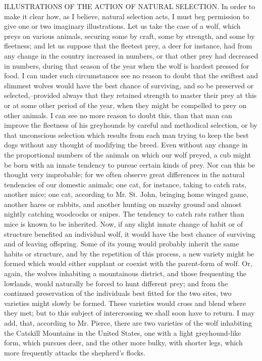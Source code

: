 ILLUSTRATIONS OF THE ACTION OF NATURAL SELECTION.
In order to make it clear how, as I believe, natural selection acts, I must beg permission to give one or two imaginary illustrations. Let us take the case of a wolf, which preys on various animals, securing some by craft, some by strength, and some by fleetness; and let us suppose that the fleetest prey, a deer for instance, had from any change in the country increased in numbers, or that other prey had decreased in numbers, during that season of the year when the wolf is hardest pressed for food. I can under such circumstances see no reason to doubt that the swiftest and slimmest wolves would have the best chance of surviving, and so be preserved or selected,--provided always that they retained strength to master their prey at this or at some other period of the year, when they might be compelled to prey on other animals. I can see no more reason to doubt this, than that man can improve the fleetness of his greyhounds by careful and methodical selection, or by that unconscious selection which results from each man trying to keep the best dogs without any thought of modifying the breed.
Even without any change in the proportional numbers of the animals on which our wolf preyed, a cub might be born with an innate tendency to pursue certain kinds of prey. Nor can this be thought very improbable; for we often observe great differences in the natural tendencies of our domestic animals; one cat, for instance, taking to catch rats, another mice; one cat, according to Mr. St. John, bringing home winged game, another hares or rabbits, and another hunting on marshy ground and almost nightly catching woodcocks or snipes. The tendency to catch rats rather than mice is known to be inherited. Now, if any slight innate change of habit or of structure benefited an individual wolf, it would have the best chance of surviving and of leaving offspring. Some of its young would probably inherit the same habits or structure, and by the repetition of this process, a new variety might be formed which would either supplant or coexist with the parent-form of wolf. Or, again, the wolves inhabiting a mountainous district, and those frequenting the lowlands, would naturally be forced to hunt different prey; and from the continued preservation of the individuals best fitted for the two sites, two varieties might slowly be formed. These varieties would cross and blend where they met; but to this subject of intercrossing we shall soon have to return. I may add, that, according to Mr. Pierce, there are two varieties of the wolf inhabiting the Catskill Mountains in the United States, one with a light greyhound-like form, which pursues deer, and the other more bulky, with shorter legs, which more frequently attacks the shepherd's flocks.
